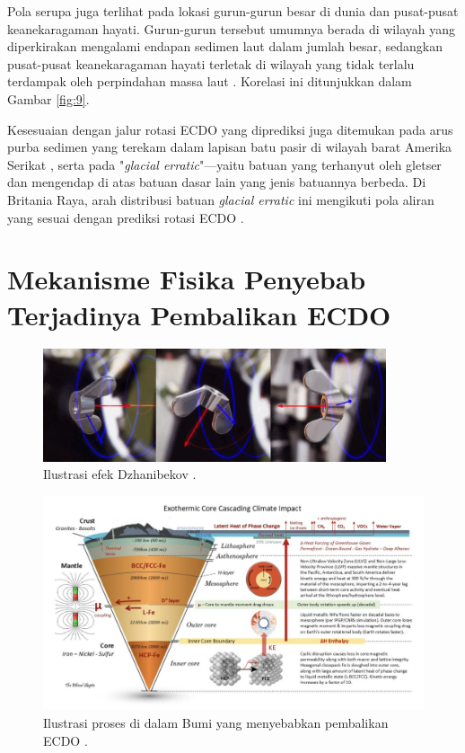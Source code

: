 \documentclass[10pt,twocolumn,letterpaper]{article}
\begin{document}
Pola serupa juga terlihat pada lokasi gurun-gurun besar di dunia dan pusat-pusat keanekaragaman hayati. Gurun-gurun tersebut umumnya berada di wilayah yang diperkirakan mengalami endapan sedimen laut dalam jumlah besar, sedangkan pusat-pusat keanekaragaman hayati terletak di wilayah yang tidak terlalu terdampak oleh perpindahan massa laut \cite{28}. Korelasi ini ditunjukkan dalam Gambar \ref{fig:9}.

Kesesuaian dengan jalur rotasi ECDO yang diprediksi juga ditemukan pada arus purba sedimen yang terekam dalam lapisan batu pasir di wilayah barat Amerika Serikat \cite{21}, serta pada "\textit{glacial erratic}"—yaitu batuan yang terhanyut oleh gletser dan mengendap di atas batuan dasar lain yang jenis batuannya berbeda. Di Britania Raya, arah distribusi batuan \textit{glacial erratic} ini mengikuti pola aliran yang sesuai dengan prediksi rotasi ECDO \cite{67,68}.

\section{Mekanisme Fisika Penyebab Terjadinya Pembalikan ECDO}

\begin{figure}
\begin{center}

\includegraphics[width=0.9\textwidth]{dzhani.jpg}
\end{center}
   \caption{Ilustrasi efek Dzhanibekov \cite{28}.}
\label{fig:10}
\end{figure}

\begin{figure}[t]
\begin{center}
\includegraphics[width=1\textwidth]{layers.jpg}
\end{center}
   \caption{Ilustrasi proses di dalam Bumi yang menyebabkan pembalikan ECDO \cite{129}.}
\label{fig:11}
\end{figure}
\end{document}
